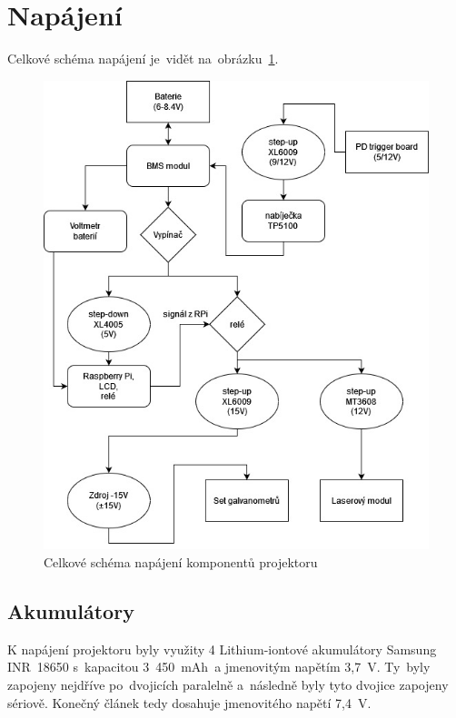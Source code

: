 \section{Napájení}
Celkové schéma napájení je~vidět na~obrázku~\ref{fig:power-schem-full}.

\begin{figure}[!h]
  \centering
  \includegraphics[width=\textwidth]{img/power-schem-full.jpg}
  \caption{\label{fig:power-schem-full} Celkové schéma napájení komponentů projektoru}
\end{figure}

\subsection{Akumulátory}
K napájení projektoru byly využity 4 Lithium-iontové akumulátory Samsung INR~18650 s~kapacitou 3~450~mAh~a jmenovitým napětím 3,7~V. Ty~byly zapojeny nejdříve po~dvojicích paralelně a~následně byly tyto dvojice zapojeny sériově. Konečný článek tedy dosahuje jmenovitého napětí 7,4~V.

